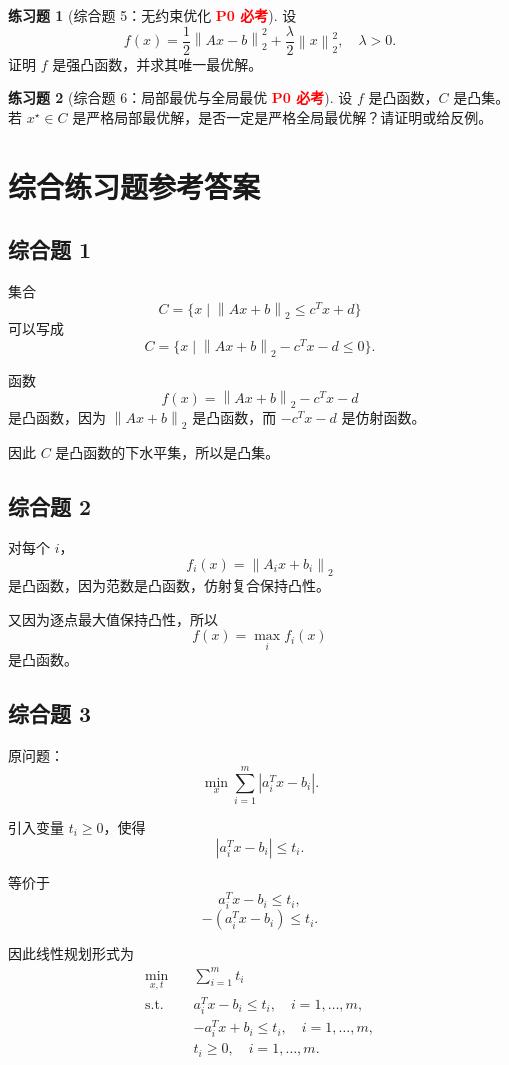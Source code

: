\documentclass[11pt,a4paper]{ctexart}
\newcommand{\st}{\text{s.t.}}
\newcommand{\norm}[1]{\left\lVert #1 \right\rVert}
\newcommand{\Pzero}{\textcolor{red}{\textbf{P0 必考}}}
\theoremstyle{definition}
\newtheorem{exercise}{练习题}[section]
\theoremstyle{plain}
\theoremstyle{remark}
\begin{document}
\begin{exercise}[综合题 5：无约束优化 \Pzero]
设
\[
    f(x)=\frac12\norm{Ax-b}_2^2+\frac{\lambda}{2}\norm{x}_2^2,
    \quad \lambda>0.
\]
证明 $f$ 是强凸函数，并求其唯一最优解。
\end{exercise}

\begin{exercise}[综合题 6：局部最优与全局最优 \Pzero]
设 $f$ 是凸函数，$C$ 是凸集。若 $x^\star\in C$ 是严格局部最优解，是否一定是严格全局最优解？请证明或给反例。
\end{exercise}

\newpage

\section{综合练习题参考答案}

\subsection*{综合题 1}

集合
\[
    C=\{x\mid \norm{Ax+b}_2\le c^Tx+d\}
\]
可以写成
\[
    C=\{x\mid \norm{Ax+b}_2-c^Tx-d\le0\}.
\]

函数
\[
    f(x)=\norm{Ax+b}_2-c^Tx-d
\]
是凸函数，因为 $\norm{Ax+b}_2$ 是凸函数，而 $-c^Tx-d$ 是仿射函数。

因此 $C$ 是凸函数的下水平集，所以是凸集。

\subsection*{综合题 2}

对每个 $i$，
\[
    f_i(x)=\norm{A_ix+b_i}_2
\]
是凸函数，因为范数是凸函数，仿射复合保持凸性。

又因为逐点最大值保持凸性，所以
\[
    f(x)=\max_i f_i(x)
\]
是凸函数。

\subsection*{综合题 3}

原问题：
\[
    \min_x \sum_{i=1}^m |a_i^Tx-b_i|.
\]

引入变量 $t_i\ge0$，使得
\[
    |a_i^Tx-b_i|\le t_i.
\]

等价于
\[
    a_i^Tx-b_i\le t_i,
\]
\[
    -(a_i^Tx-b_i)\le t_i.
\]

因此线性规划形式为
\[
\begin{aligned}
    \min_{x,t}\quad &
    \sum_{i=1}^m t_i\\
    \st\quad &
    a_i^Tx-b_i\le t_i,\quad i=1,\dots,m,\\
    & -a_i^Tx+b_i\le t_i,\quad i=1,\dots,m,\\
    & t_i\ge0,\quad i=1,\dots,m.
\end{aligned}
\]
\end{document}
